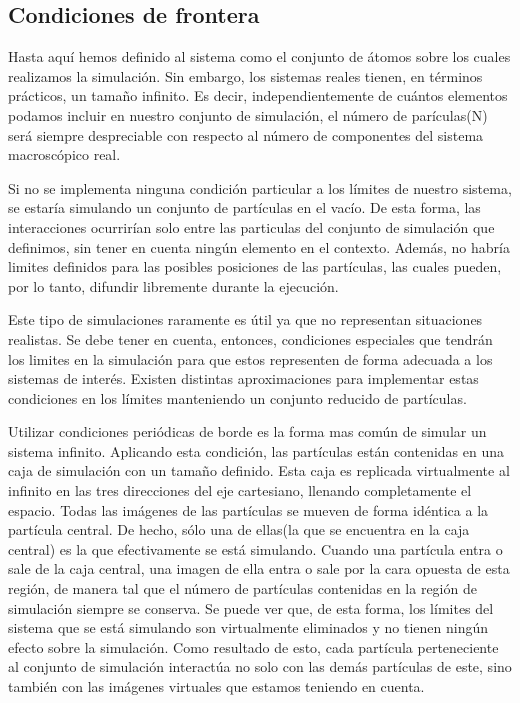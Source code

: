 \subsection{Condiciones de frontera}

Hasta aquí hemos definido al sistema como el conjunto de átomos sobre los cuales realizamos la simulación. 
Sin embargo, los sistemas reales tienen, en términos prácticos, un tamaño infinito. 
Es decir, independientemente de cuántos elementos podamos incluir en nuestro conjunto de simulación, el número de parículas(N) será siempre despreciable con respecto al número de componentes del sistema macroscópico real.

Si no se implementa ninguna condición particular a los límites de nuestro sistema, se estaría simulando un conjunto de partículas en el vacío. 
De esta forma, las interacciones ocurrirían solo entre las particulas del conjunto de simulación que definimos, sin tener en cuenta ningún elemento en el contexto.
Además, no habría limites definidos para las posibles posiciones de las partículas, las cuales pueden, por lo tanto, difundir libremente durante la ejecución.

Este tipo de simulaciones raramente es útil ya que no representan situaciones realistas. Se debe tener en cuenta, entonces, condiciones especiales que tendrán los limites en la simulación para que estos representen de forma adecuada a los sistemas de interés.
Existen distintas aproximaciones para implementar estas condiciones en los límites manteniendo un conjunto reducido de partículas.

Utilizar condiciones periódicas de borde es la forma mas común de simular un sistema infinito. Aplicando esta condición, las partículas están contenidas en una caja de simulación con un tamaño definido. 
Esta caja es replicada virtualmente al infinito en las tres direcciones del eje cartesiano, llenando completamente el espacio.
Todas las imágenes de las partículas se mueven de forma idéntica a la partícula central. De hecho, sólo una de ellas(la que se encuentra en la caja central) es la que efectivamente se está simulando.
Cuando una partícula entra o sale de la caja central, una imagen de ella entra o sale por la cara opuesta de esta región, de manera tal que el número de partículas contenidas en la región de simulación siempre se conserva.
Se puede ver que, de esta forma, los límites del sistema que se está simulando son virtualmente eliminados y no tienen ningún efecto sobre la simulación.
Como resultado de esto, cada partícula perteneciente al conjunto de simulación interactúa no solo con las demás partículas de este, sino también con las imágenes virtuales que estamos teniendo en cuenta.

